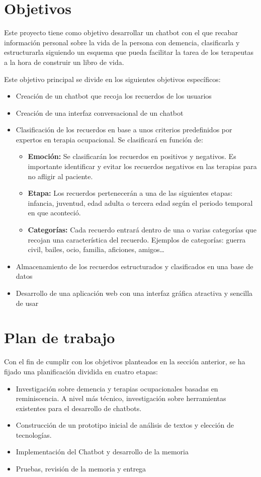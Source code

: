 \section{Objetivos}

Este proyecto tiene como objetivo desarrollar un chatbot con el que recabar información personal sobre la vida de la persona con demencia, clasificarla y estructurarla siguiendo un esquema que pueda facilitar la tarea de los terapeutas a la hora de construir un libro de vida. 

Este objetivo principal se divide en los siguientes objetivos específicos:
\begin{itemize}
	\item Creación de un chatbot que recoja los recuerdos de los usuarios
	\item Creación de una interfaz conversacional de un chatbot
	\item Clasificación de los recuerdos en base a unos criterios predefinidos por expertos en terapia ocupacional. Se clasificará en función de: 
	\begin{itemize}
		\item \textbf{Emoción:} Se clasificarán los recuerdos en positivos y negativos. Es importante identificar y evitar los recuerdos negativos en las terapias para no afligir al paciente. 
		\item \textbf{Etapa:} Los recuerdos pertenecerán a una de las siguientes etapas: infancia, juventud, edad adulta o tercera edad según el periodo temporal en que aconteció.
		\item \textbf{Categorías:} Cada recuerdo entrará dentro de una o varias categorías que recojan una característica del recuerdo. Ejemplos de categorías: guerra civil, bailes, ocio, familia, aficiones, amigos…
	\end{itemize}
	\item Almacenamiento de los recuerdos estructurados y clasificados en una base de datos 
	\item Desarrollo de una aplicación web con una interfaz gráfica atractiva y sencilla de usar
\end{itemize}


\section{Plan de trabajo}

Con el fin de cumplir con los objetivos planteados en la sección anterior, se ha fijado una planificación dividida en cuatro etapas:
\begin{itemize}
	\item Investigación sobre demencia y terapias ocupacionales basadas en reminiscencia. A nivel más técnico, investigación sobre herramientas existentes para el desarrollo de chatbots.
	\item Construcción de un prototipo inicial de análisis de textos y elección de tecnologías.
	\item Implementación del Chatbot y desarrollo de la memoria
	\item Pruebas, revisión de la memoria y entrega
\end{itemize}

